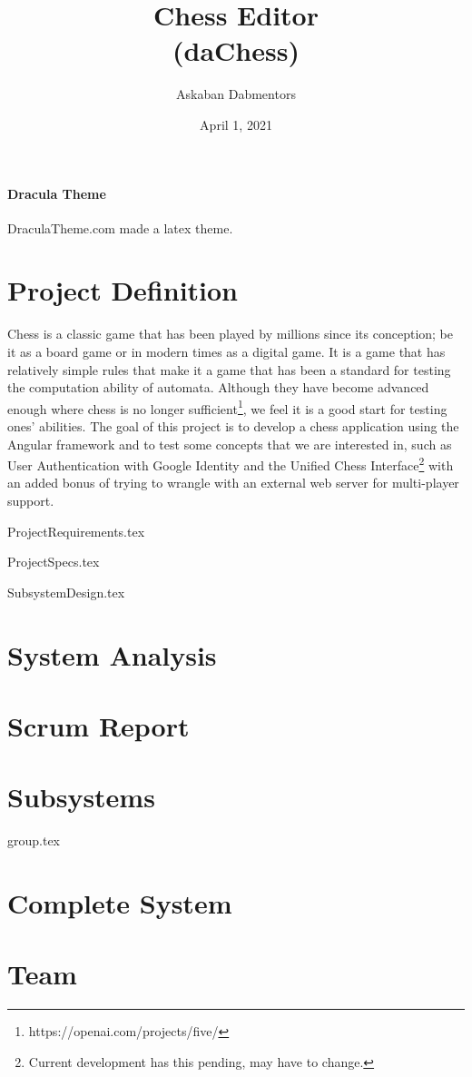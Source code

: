 \documentclass[12pt]{article}
\title{\color{draculacyan}Chess Editor\\(daChess)}
\author{\color{draculared}Askaban Dabmentors}
\date{\color{draculared}April 1, 2021}
\begin{document}
	\paragraph{Dracula Theme}
	DraculaTheme.com made a latex theme.
	\maketitle
	
	\section{Project Definition}
	Chess is a classic game that has been played by millions since its conception; be it as a board game or in modern times as a digital game. It is a game that has relatively simple rules that make it a game that has been a standard for testing the computation ability of automata. Although they have become advanced enough where chess is no longer sufficient\footnote{https://openai.com/projects/five/}, we feel it is a good start for testing ones' abilities. The goal of this project is to develop a chess application using the Angular framework and to test some concepts that we are interested in, such as User Authentication with Google Identity and the Unified Chess Interface\footnote{Current development has this pending, may have to change.}  with an added bonus of trying to wrangle with an external web server for multi-player support.
	
	
	\newpage
	{ProjectRequirements.tex}
	
	\newpage
	{ProjectSpecs.tex}
	
	\newpage
	{SubsystemDesign.tex}
	\section{System Analysis}
	\section{Scrum Report}
	
	\section{Subsystems}
	{group.tex}
	
	\section{Complete System}
	\section{Team}
	
\end{document}
